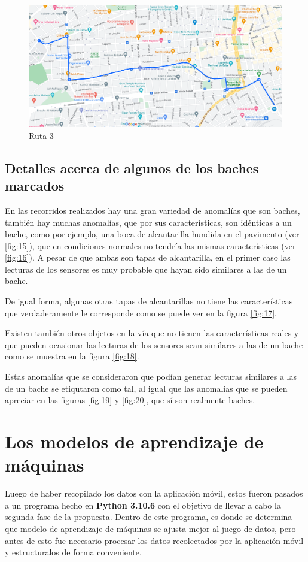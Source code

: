 	\begin{figure}[htb]
		\centering
		\includegraphics[scale = 0.4]{Graphics/route_3_EgidoArsenal_LyJovellarHotelColina.png}
		\caption{Ruta 3}
		\label{fig:12}
	\end{figure}

	\subsection{Detalles acerca de algunos de los baches marcados}
		En las recorridos realizados hay una gran variedad de anomalías que son baches, también hay muchas anomalías, que por sus características,
		son idénticas a un bache, como por ejemplo, una boca de alcantarilla hundida en el pavimento (ver \ref{fig:15}), que en condiciones normales no 
		tendría las mismas características (ver \ref{fig:16}). A pesar de que ambas son tapas de alcantarilla, en el primer caso las lecturas de los 
		sensores es muy probable que hayan sido similares a las de un bache.

		De igual forma, algunas otras tapas de alcantarillas no tiene las características que verdaderamente le corresponde como se puede ver en la
		figura \ref{fig:17}.

		Existen también otros objetos en la vía que no tienen las características reales y que pueden ocasionar las lecturas de los sensores sean similares
		a las de un bache como se muestra en la figura \ref{fig:18}.

		Estas anomalías que se consideraron que podían generar lecturas	similares a las de un bache se etiqutaron como tal, al igual que las anomalías que se 
		pueden apreciar en las figuras \ref{fig:19} y \ref{fig:20}, que sí son realmente baches.

\section{Los modelos de aprendizaje de máquinas}
	Luego de haber recopilado los datos con la aplicación móvil, estos fueron pasados a un programa hecho en \textbf{Python 3.10.6} con el objetivo
	de llevar a cabo la segunda fase de la propuesta. Dentro de este programa, es donde se determina que modelo de aprendizaje de máquinas se ajusta
	mejor al juego de datos, pero antes de esto fue necesario procesar los datos recolectados por la aplicación móvil y estructuralos de forma conveniente. 

